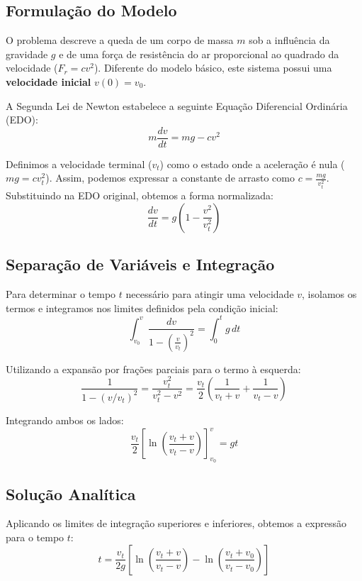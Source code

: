 \subsection*{Formulação do Modelo}
O problema descreve a queda de um corpo de massa $m$ sob a influência da gravidade $g$ e de uma força de resistência do ar proporcional ao quadrado da velocidade ($F_r = cv^2$). Diferente do modelo básico, este sistema possui uma \textbf{velocidade inicial} $v(0) = v_0$.

A Segunda Lei de Newton estabelece a seguinte Equação Diferencial Ordinária (EDO):
\begin{equation}
    m \frac{dv}{dt} = mg - cv^2
\end{equation}

Definimos a velocidade terminal ($v_t$) como o estado onde a aceleração é nula ($mg = cv_t^2$). Assim, podemos expressar a constante de arrasto como $c = \frac{mg}{v_t^2}$. Substituindo na EDO original, obtemos a forma normalizada:
\begin{equation}
    \frac{dv}{dt} = g \left( 1 - \frac{v^2}{v_t^2} \right)
\end{equation}

\subsection*{Separação de Variáveis e Integração}
Para determinar o tempo $t$ necessário para atingir uma velocidade $v$, isolamos os termos e integramos nos limites definidos pela condição inicial:
\begin{equation}
    \int_{v_0}^{v} \frac{dv}{1 - \left( \frac{v}{v_t} \right)^2} = \int_{0}^{t} g \, dt
\end{equation}

Utilizando a expansão por frações parciais para o termo à esquerda:
\begin{equation}
    \frac{1}{1 - (v/v_t)^2} = \frac{v_t^2}{v_t^2 - v^2} = \frac{v_t}{2} \left( \frac{1}{v_t + v} + \frac{1}{v_t - v} \right)
\end{equation}

Integrando ambos os lados:
\begin{equation}
    \frac{v_t}{2} \left[ \ln \left( \frac{v_t + v}{v_t - v} \right) \right]_{v_0}^{v} = gt
\end{equation}

\subsection*{Solução Analítica}
Aplicando os limites de integração superiores e inferiores, obtemos a expressão para o tempo $t$:
\begin{equation}
    t = \frac{v_t}{2g} \left[ \ln \left( \frac{v_t + v}{v_t - v} \right) - \ln \left( \frac{v_t + v_0}{v_t - v_0} \right) \right]
\end{equation}

